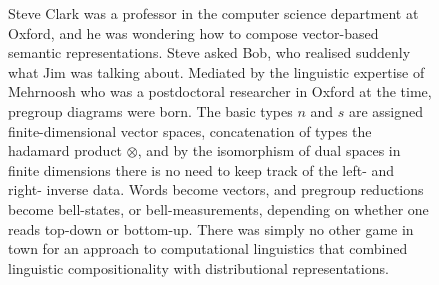\begin{figure}[h!]
\centering
{}
\caption{Steve Clark was a professor in the computer science department at Oxford, and he was wondering how to compose vector-based semantic representations. Steve asked Bob, who realised suddenly what Jim was talking about. Mediated by the linguistic expertise of Mehrnoosh who was a postdoctoral researcher in Oxford at the time, pregroup diagrams were born. The basic types $n$ and $s$ are assigned finite-dimensional vector spaces, concatenation of types the hadamard product $\otimes$, and by the isomorphism of dual spaces in finite dimensions there is no need to keep track of the left- and right- inverse data. Words become vectors, and pregroup reductions become bell-states, or bell-measurements, depending on whether one reads top-down or bottom-up. There was simply no other game in town for an approach to computational linguistics that combined linguistic compositionality with distributional representations.}
\end{figure}

